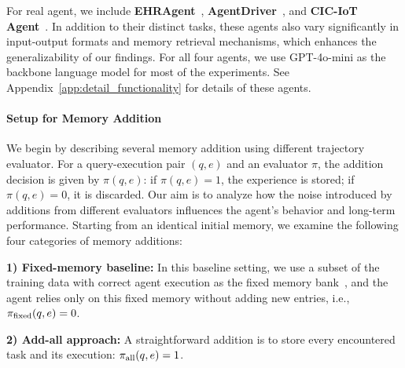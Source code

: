 \documentclass[11pt]{article}
\theoremstyle{plain}
\theoremstyle{definition}
\newcommand{\zhen}[1]{\textcolor{blue}{[Zhen: #1]}}
\begin{document}
For real agent, we include \textbf{EHRAgent}~\cite{shi2024ehragent}, \textbf{AgentDriver}~\cite{mao2023language}, and \textbf{CIC-IoT Agent}~\cite{ciciot}.
In addition to their distinct tasks, these agents also vary significantly in input-output formats and memory retrieval mechanisms, which enhances the generalizability of our findings.
For all four agents, we use GPT-4o-mini as the backbone language model for most of the experiments.
See Appendix~\ref{app:detail_functionality} for details of these agents.


\paragraph{Setup for Memory Addition} We begin by describing several memory addition using different trajectory evaluator.
For a query-execution pair \((q, e)\) and an evaluator \(\pi\), the addition decision is given by \(\pi(q, e)\): if \(\pi(q, e) = 1\), the experience is stored; if \(\pi(q, e) = 0\), it is discarded. Our aim is to analyze how the noise introduced by additions from different evaluators influences the agent's behavior and long-term performance.
Starting from an identical initial memory, we examine the following four categories of memory additions:

\textbf{1) Fixed-memory baseline:} 
In this baseline setting, we use a subset of the training data with correct agent execution as the fixed memory bank~\cite{mao2023language,li2023tradinggpt,zhao2024expel,zheng2023synapse}, and the agent relies only on this fixed memory without adding new entries, i.e., \(\pi_{\rm fixed}(q, e) = 0\).

\textbf{2) Add-all approach:} A straightforward addition is to store every encountered task and its execution: \(\pi_{\rm all}(q, e) = 1\).
\end{document}
